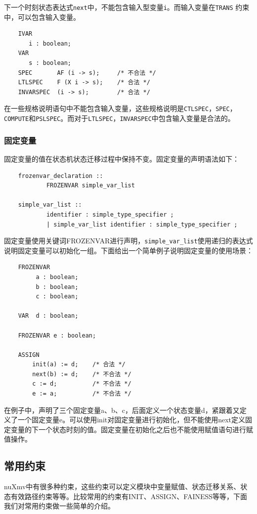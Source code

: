下一个时刻状态表达式\verb|next|中，不能包含输入型变量\verb|i|。而输入变量在\verb|TRANS| 约束中，可以包含输入变量。

\begin{lstlisting}
    IVAR
       i : boolean;
    VAR
       s : boolean;
    SPEC       AF (i -> s);     /* 不合法 */
    LTLSPEC    F (X i -> s);    /* 合法 */
    INVARSPEC  (i -> s);        /* 合法 */
\end{lstlisting}

在一些规格说明语句中不能包含输入变量，这些规格说明是\verb|CTLSPEC|，\verb|SPEC|，\verb|COMPUTE|和\verb|PSLSPEC|。而对于\verb|LTLSPEC|，\verb|INVARSPEC|中包含输入变量是合法的。

\subsubsection{固定变量}
固定变量的值在状态机状态迁移过程中保持不变。固定变量的声明语法如下：

\begin{lstlisting}
    frozenvar_declaration ::
            FROZENVAR simple_var_list

    simple_var_list ::
            identifier : simple_type_specifier ;
            | simple_var_list identifier : simple_type_specifier ;
\end{lstlisting}

固定变量使用关键词FROZENVAR进行声明，\verb|simple_var_list|使用递归的表达式说明固定变量可以初始化一组。下面给出一个简单例子说明固定变量的使用场景：

\begin{lstlisting}
    FROZENVAR
         a : boolean;
         b : boolean;
         c : boolean;

    VAR  d : boolean;

    FROZENVAR e : boolean;

    ASSIGN
        init(a) := d;    /* 合法 */
        next(b) := d;    /* 不合法 */
        c := d;          /* 不合法 */
        e := a;          /* 不合法 */
\end{lstlisting}

在例子中，声明了三个固定变量a、b、c，后面定义一个状态变量d，紧跟着又定义了一个固定变量e。可以使用init对固定变量进行初始化，但不能使用next定义固定变量的下一个状态时刻的值。固定变量在初始化之后也不能使用赋值语句进行赋值操作。

\subsection{常用约束}
nuXmv中有很多种约束，这些约束可以定义模块中变量赋值、状态迁移关系、状态有效路径约束等等。比较常用的约束有INIT、ASSIGN、FAINESS等等，下面我们对常用约束做一些简单的介绍。

